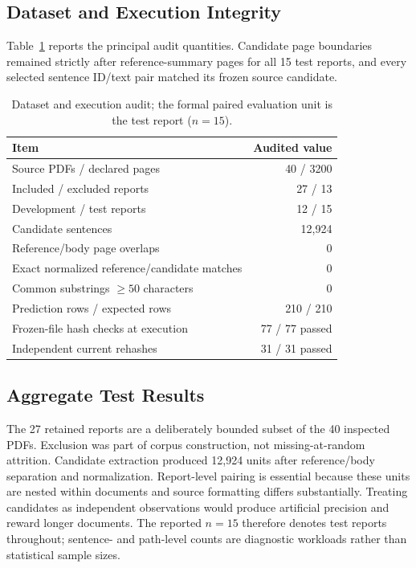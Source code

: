 \documentclass[applsci,article,submit,moreauthors]{Definitions/mdpi}
\begin{document}
\subsection{Dataset and Execution Integrity}

Table~\ref{tab:audit} reports the principal audit quantities. Candidate page boundaries remained strictly after reference-summary pages for all 15 test reports, and every selected sentence ID/text pair matched its frozen source candidate.

\begin{table}[H]
\caption{Dataset and execution audit; the formal paired evaluation unit is the test report ($n=15$).}
\label{tab:audit}\centering
\begin{tabular}{lr}
\toprule
Item & Audited value\\
\midrule
Source PDFs / declared pages & 40 / 3200\\
Included / excluded reports & 27 / 13\\
Development / test reports & 12 / 15\\
Candidate sentences & 12,924\\
Reference/body page overlaps & 0\\
Exact normalized reference/candidate matches & 0\\
Common substrings $\geq50$ characters & 0\\
Prediction rows / expected rows & 210 / 210\\
Frozen-file hash checks at execution & 77 / 77 passed\\
Independent current rehashes & 31 / 31 passed\\
\bottomrule
\end{tabular}
\end{table}

\subsection{Aggregate Test Results}

The 27 retained reports are a deliberately bounded subset of the 40 inspected PDFs. Exclusion was part of corpus construction, not missing-at-random attrition. Candidate extraction produced 12,924 units after reference/body separation and normalization. Report-level pairing is essential because these units are nested within documents and source formatting differs substantially. Treating candidates as independent observations would produce artificial precision and reward longer documents. The reported $n=15$ therefore denotes test reports throughout; sentence- and path-level counts are diagnostic workloads rather than statistical sample sizes.
\end{document}
